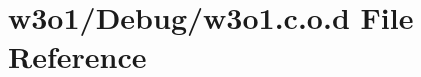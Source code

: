 \hypertarget{w3o1_8c_8o_8d}{}\section{w3o1/\+Debug/w3o1.c.\+o.\+d File Reference}
\label{w3o1_8c_8o_8d}
